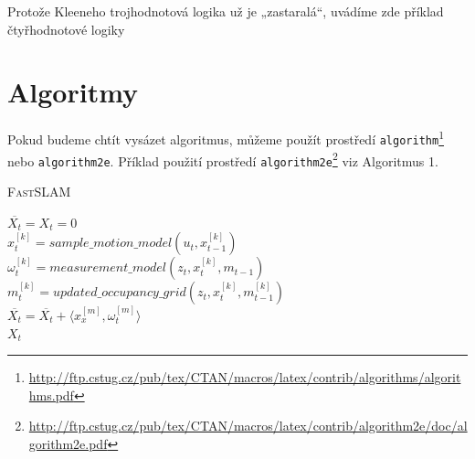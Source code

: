 \documentclass[a4paper,11pt]{article}
\begin{document}
\begin{table}[h]
    \caption{Protože Kleeneho trojhodnotová logika už je „zastaralá“, uvádíme zde příklad čtyřhodnotové logiky}
    \label{tab:math}
\end{table}

\clearpage

\section{Algoritmy}
Pokud budeme chtít vysázet algoritmus, můžeme použít prostředí \texttt{algorithm}\footnote{\url{http://ftp.cstug.cz/pub/tex/CTAN/macros/latex/contrib/algorithms/algorithms.pdf}} nebo \texttt{algorithm2e}. Příklad použití prostředí \texttt{algorithm2e}\footnote{\url{http://ftp.cstug.cz/pub/tex/CTAN/macros/latex/contrib/algorithm2e/doc/algorithm2e.pdf}} viz Algoritmus 1.



\begin{algorithm}
    \SetAlgoNoLine  
    \caption{\textsc{FastSLAM}}
        \SetNlSty{}{}{:}
        \SetNlSkip{-1em}
        
        \vspace{0.5em}
        
        \Indp $\overline{X_t} = X_t = 0$ \\
         {
            $x^{[k]}_t = \textit{sample\_motion\_model}(u_t,x^{[k]}_{t-1})$ \\
            $\omega_t^{[k]} = \textit{measurement\_model}(z_t,x^{[k]}_t,m_{t-1})$ \\
            $m_t^{[k]} = updated\_occupancy\_grid(z_t,x^{[k]}_t,m^{[k]}_{t-1})$ \\
            $\overline{X_t} = \overline{X_t} + \langle x_x^{[m]},\omega_t^{[m]}\rangle$ \\
        }
        \Return $X_t$
\end{algorithm}
\end{document}
